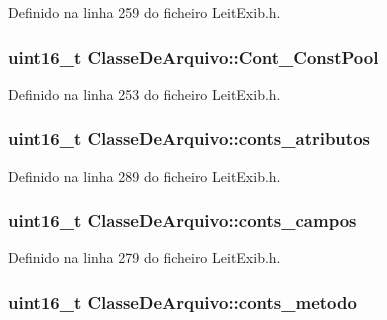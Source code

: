 Definido na linha 259 do ficheiro Leit\-Exib.\-h.

\hypertarget{struct_classe_de_arquivo_a86527645a99cde472e6ae443aaff7b4e}{
\subsubsection[{Cont\-\_\-\-Const\-Pool}]{\setlength{\rightskip}{0pt plus 5cm}uint16\-\_\-t Classe\-De\-Arquivo\-::\-Cont\-\_\-\-Const\-Pool}}\label{struct_classe_de_arquivo_a86527645a99cde472e6ae443aaff7b4e}


Definido na linha 253 do ficheiro Leit\-Exib.\-h.

\hypertarget{struct_classe_de_arquivo_aedc3f8105d268a28a6a02b39b28f8ddd}{
\subsubsection[{conts\-\_\-atributos}]{\setlength{\rightskip}{0pt plus 5cm}uint16\-\_\-t Classe\-De\-Arquivo\-::conts\-\_\-atributos}}\label{struct_classe_de_arquivo_aedc3f8105d268a28a6a02b39b28f8ddd}


Definido na linha 289 do ficheiro Leit\-Exib.\-h.

\hypertarget{struct_classe_de_arquivo_a11ed358daa97442f5d1e16f5acf4fbcc}{
\subsubsection[{conts\-\_\-campos}]{\setlength{\rightskip}{0pt plus 5cm}uint16\-\_\-t Classe\-De\-Arquivo\-::conts\-\_\-campos}}\label{struct_classe_de_arquivo_a11ed358daa97442f5d1e16f5acf4fbcc}


Definido na linha 279 do ficheiro Leit\-Exib.\-h.

\hypertarget{struct_classe_de_arquivo_a51e6aee87a53ffaec03f9fde63b33f35}{
\subsubsection[{conts\-\_\-metodo}]{\setlength{\rightskip}{0pt plus 5cm}uint16\-\_\-t Classe\-De\-Arquivo\-::conts\-\_\-metodo}}\label{struct_classe_de_arquivo_a51e6aee87a53ffaec03f9fde63b33f35}


